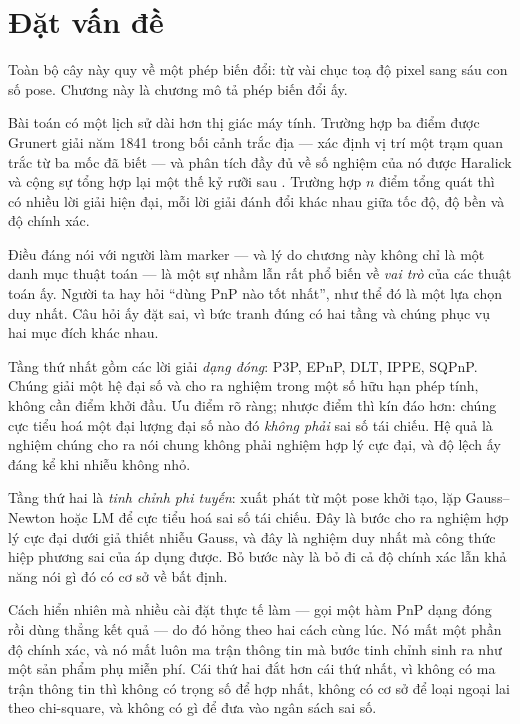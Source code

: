 \documentclass[../../marker.tex]{subfiles}
\begin{document}
\section{Đặt vấn đề}

Toàn bộ cây này quy về một phép biến đổi: từ vài chục toạ độ pixel sang sáu con số pose. Chương này là chương mô tả phép biến đổi ấy.

Bài toán có một lịch sử dài hơn thị giác máy tính. Trường hợp ba điểm được Grunert giải năm 1841 trong bối cảnh trắc địa --- xác định vị trí một trạm quan trắc từ ba mốc đã biết --- và phân tích đầy đủ về số nghiệm của nó được Haralick và cộng sự tổng hợp lại một thế kỷ rưỡi sau \cite{haralick1994review}. Trường hợp \(n\) điểm tổng quát thì có nhiều lời giải hiện đại, mỗi lời giải đánh đổi khác nhau giữa tốc độ, độ bền và độ chính xác.

Điều đáng nói với người làm marker --- và lý do chương này không chỉ là một danh mục thuật toán --- là một sự nhầm lẫn rất phổ biến về \emph{vai trò} của các thuật toán ấy. Người ta hay hỏi ``dùng PnP nào tốt nhất'', như thể đó là một lựa chọn duy nhất. Câu hỏi ấy đặt sai, vì bức tranh đúng có hai tầng và chúng phục vụ hai mục đích khác nhau.

Tầng thứ nhất gồm các lời giải \emph{dạng đóng}: P3P, EPnP, DLT, IPPE, SQPnP. Chúng giải một hệ đại số và cho ra nghiệm trong một số hữu hạn phép tính, không cần điểm khởi đầu. Ưu điểm rõ ràng; nhược điểm thì kín đáo hơn: chúng cực tiểu hoá một đại lượng đại số nào đó \emph{không phải} sai số tái chiếu. Hệ quả là nghiệm chúng cho ra nói chung không phải nghiệm hợp lý cực đại, và độ lệch ấy đáng kể khi nhiễu không nhỏ.

Tầng thứ hai là \emph{tinh chỉnh phi tuyến}: xuất phát từ một pose khởi tạo, lặp Gauss--Newton hoặc LM để cực tiểu hoá sai số tái chiếu. Đây là bước cho ra nghiệm hợp lý cực đại dưới giả thiết nhiễu Gauss, và đây là nghiệm duy nhất mà công thức hiệp phương sai của  áp dụng được. Bỏ bước này là bỏ đi cả độ chính xác lẫn khả năng nói gì đó có cơ sở về bất định.

Cách hiển nhiên mà nhiều cài đặt thực tế làm --- gọi một hàm PnP dạng đóng rồi dùng thẳng kết quả --- do đó hỏng theo hai cách cùng lúc. Nó mất một phần độ chính xác, và nó mất luôn ma trận thông tin mà bước tinh chỉnh sinh ra như một sản phẩm phụ miễn phí. Cái thứ hai đắt hơn cái thứ nhất, vì không có ma trận thông tin thì không có trọng số để hợp nhất, không có cơ sở để loại ngoại lai theo chi-square, và không có gì để đưa vào ngân sách sai số.
\end{document}

